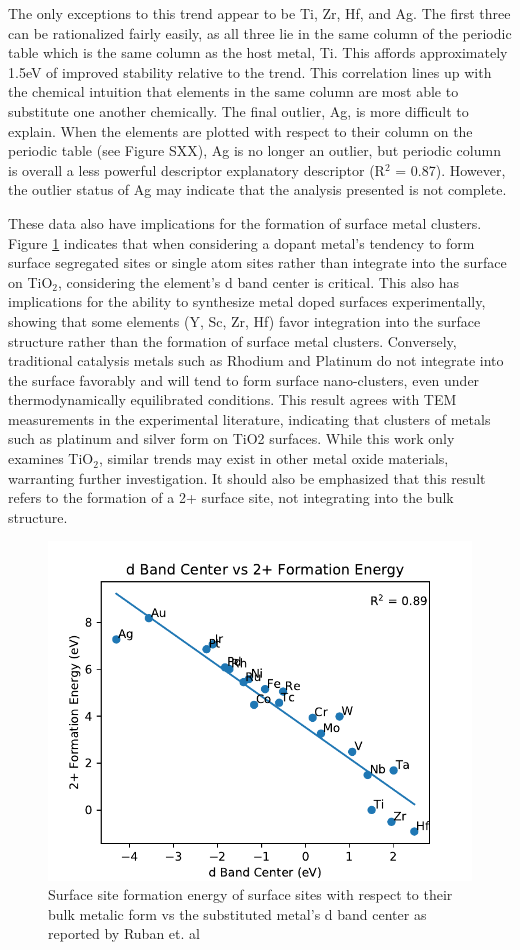 \documentclass[catalysts,article,submit,moreauthors,pdftex,10pt,a4paper]{mdpi}
\theoremstyle{mdpi}
\newcounter{ex}
\newcounter{re}
\theoremstyle{mdpidefinition}
\begin{document}
The only exceptions to this trend appear to be Ti, Zr, Hf, and Ag. The first three can be rationalized fairly easily, as all three lie in the same column of the periodic table which is the same column as the host metal, Ti. This affords approximately 1.5eV of improved stability relative to the trend. This correlation lines up with the chemical intuition that elements in the same column are most able to substitute one another chemically. The final outlier, Ag, is more difficult to explain. When the elements are plotted with respect to their column on the periodic table (see Figure SXX), Ag is no longer an outlier, but periodic column is overall a less powerful descriptor explanatory descriptor (R$^2$ = 0.87). However, the outlier status of Ag may indicate that the analysis presented is not complete.

These data also have implications for the formation of surface metal clusters. Figure \ref{fig:d_band} indicates that when considering a dopant metal's tendency to form surface segregated sites or single atom sites rather than integrate into the surface on TiO$_2$, considering the element's d band center is critical. This also has implications for the ability to synthesize metal doped surfaces experimentally, showing that some elements (Y, Sc, Zr, Hf) favor integration into the surface structure rather than the formation of surface metal clusters. Conversely, traditional catalysis metals such as Rhodium and Platinum do not integrate into the surface favorably and will tend to form surface nano-clusters, even under thermodynamically equilibrated conditions. This result agrees with TEM measurements in the experimental literature, indicating that clusters of metals such as platinum and silver form on TiO2 surfaces.\cite{Iliev_2006}  While this work only examines TiO$_2$, similar trends may exist in other metal oxide materials, warranting further investigation. It should also be emphasized that this result refers to the formation of a 2+ surface site, not integrating into the bulk structure.

\begin{figure}
    \centering
    \includegraphics[width=0.8\linewidth]{Images/d_band_vs_formation.pdf}
    \caption{Surface site formation energy of surface sites with respect to their bulk metalic form vs the substituted metal's d band center as reported by Ruban et. al \cite{Ruban_1997}}
    \label{fig:d_band}
\end{figure}
\end{document}
